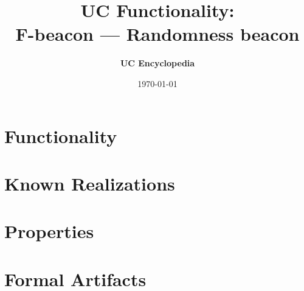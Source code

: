 \documentclass[11pt,a4paper]{article}
\title{\textbf{\Large UC Functionality:}\\[0.2em] \Large F-beacon --- Randomness beacon}
\author{\textbf{UC Encyclopedia}}
\date{\today}
\newtheorem{functionality}{Functionality}
\begin{document}
\maketitle

\begin{abstract}
\end{abstract}

\section{Functionality}

%

\section{Known Realizations}


\section{Properties}


\section{Formal Artifacts}

\end{document}
